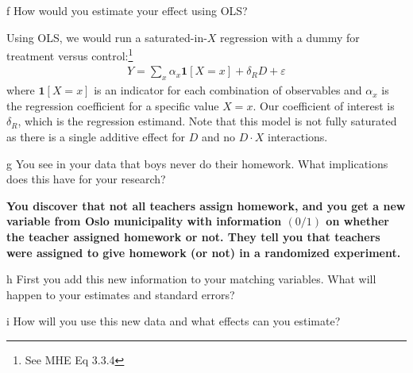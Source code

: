 \documentclass{article}
\begin{document}
\begin{problem}{f}
How would you estimate your effect using OLS?
\end{problem}
\begin{solution}
Using OLS, we would run a saturated-in-$X$ regression with a dummy for treatment versus control:\footnote{See MHE Eq 3.3.4}
\begin{align*}
    Y = \sum_x \alpha_x \mathbf{1}[X=x] + \delta_R D + \varepsilon
\end{align*}
where $\mathbf{1}[X=x]$ is an indicator for each combination of observables and $\alpha_x$ is the regression coefficient for a specific value $X=x$. Our coefficient of interest is $\delta_R$, which is the regression estimand. Note that this model is not fully saturated as there is a single additive effect for $D$ and no $D\cdot X$ interactions.


\end{solution}


\begin{problem}{g}
You see in your data that boys never do their homework. What implications does this have for your research?
\end{problem}
\begin{solution}
\end{solution}

\textbf{You discover that not all teachers assign homework, and you get a new variable from Oslo municipality with information $(0 / 1)$ on whether the teacher assigned homework or not. They tell you that teachers were assigned to give homework (or not) in a randomized experiment.}
\begin{problem}{h}
First you add this new information to your matching variables. What will happen to your estimates and standard errors?
\end{problem}
\begin{solution}
\end{solution}


\begin{problem}{i}
How will you use this new data and what effects can you estimate?
\end{problem}
\begin{solution}
\end{solution}


\newpage
\end{document}
